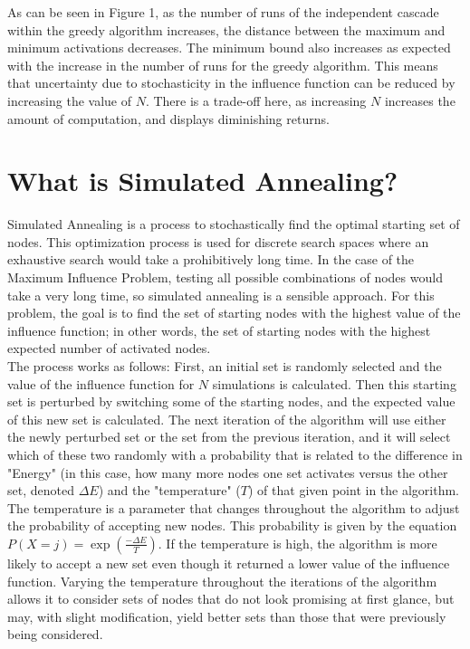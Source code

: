 \documentclass[11pt]{scrartcl} %
\begin{document}
As can be seen in Figure 1, as the number of runs of the independent cascade within the greedy algorithm increases, the distance between the maximum and minimum activations decreases. The minimum bound also increases as expected with the increase in the number of runs for the greedy algorithm.  This means that uncertainty due to stochasticity in the influence function can be reduced by increasing the value of $N$.  There is a trade-off here, as increasing $N$ increases the amount of computation, and displays diminishing returns.  

\section{What is Simulated Annealing?}

Simulated Annealing is a process to stochastically find the optimal starting set of nodes.  This optimization process is used for discrete search spaces where an exhaustive search would take a prohibitively long time.  In the case of the Maximum Influence Problem, testing all possible combinations of nodes would take a very long time, so simulated annealing is a sensible approach.  For this problem, the goal is to find the set of starting nodes with the highest value of the influence function; in other words, the set of starting nodes with the highest expected number of activated nodes.\\  

The process works as follows: First, an initial set is randomly selected and the value of the influence function for $N$ simulations is calculated.  Then this starting set is perturbed by switching some of the starting nodes, and the expected value of this new set is calculated.  The next iteration of the algorithm will use either the newly perturbed set or the set from the previous iteration, and it will select which of these two randomly with a probability that is related to the difference in "Energy" (in this case, how many more nodes one set activates versus the other set, denoted $\Delta E$) and the "temperature" ($T$) of that given point in the algorithm.  The temperature is a parameter that changes throughout the algorithm to adjust the probability of accepting new nodes.  This probability is given by the equation $P(X=j)=\exp({\frac{-\Delta E}{T}})$.  If the temperature is high, the algorithm is more likely to accept a new set even though it returned a lower value of the influence function.  Varying the temperature throughout the iterations of the algorithm allows it to consider sets of nodes that do not look promising at first glance, but may, with slight modification, yield better sets than those that were previously being considered.  \\
\end{document}
